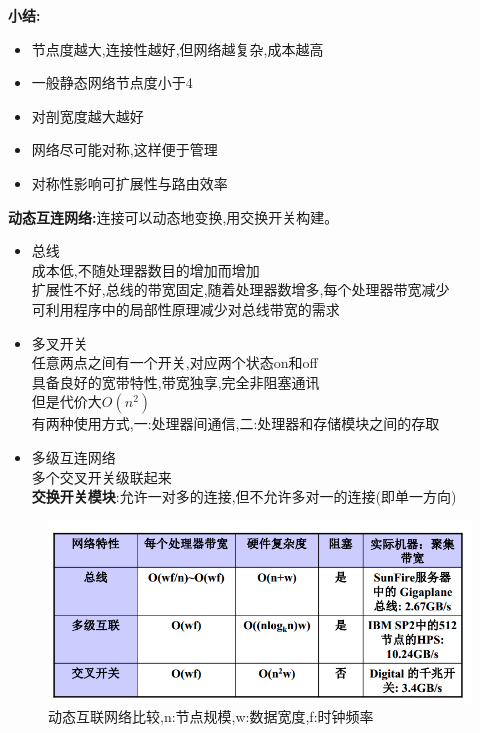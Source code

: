 \documentclass[UTF8,a4paper]{ctexart}
\newcommand{\spaceline}{\vspace{\baselineskip}}
\begin{document}
  \textbf{小结:}
  \begin{itemize}
    \item 节点度越大,连接性越好,但网络越复杂,成本越高
    \item 一般静态网络节点度小于4
    \item 对剖宽度越大越好
    \item 网络尽可能对称,这样便于管理
    \item 对称性影响可扩展性与路由效率
  \end{itemize}

  \spaceline
  \textbf{动态互连网络:}连接可以动态地变换,用交换开关构建。
  \begin{itemize}
    \item 总线\\
    成本低,不随处理器数目的增加而增加\\
    扩展性不好,总线的带宽固定,随着处理器数增多,每个处理器带宽减少\\
    可利用程序中的局部性原理减少对总线带宽的需求
    \item 多叉开关\\
    任意两点之间有一个开关,对应两个状态on和off\\
    具备良好的宽带特性,带宽独享,完全非阻塞通讯\\
    但是代价大$O(n^2)$\\
    有两种使用方式,一:处理器间通信,二:处理器和存储模块之间的存取\\
    \item 多级互连网络\\
    多个交叉开关级联起来\\
    \textbf{交换开关模块}:允许一对多的连接,但不允许多对一的连接(即单一方向)
  \end{itemize}

  \begin{figure}[H]
    \centering
    \includegraphics[scale = 0.5]{assets/ParallelComputing_3cbfc.png}
    \caption{动态互联网络比较,n:节点规模,w:数据宽度,f:时钟频率}
  \end{figure}
\end{document}
